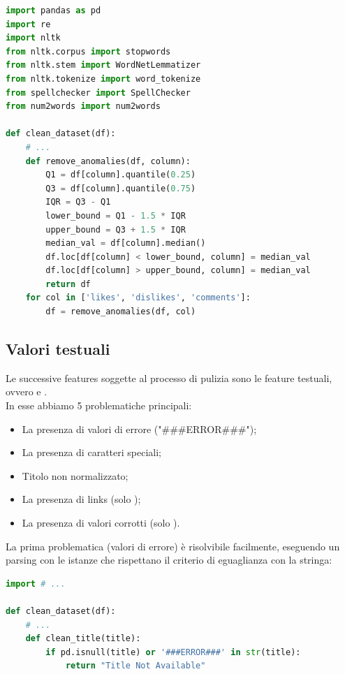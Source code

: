 \documentclass[a4paper,12pt]{report}
\begin{document}
\newpage
\begin{lstlisting}[language=Python]
import pandas as pd
import re
import nltk
from nltk.corpus import stopwords
from nltk.stem import WordNetLemmatizer
from nltk.tokenize import word_tokenize
from spellchecker import SpellChecker
from num2words import num2words

def clean_dataset(df):
    # ...
    def remove_anomalies(df, column):
        Q1 = df[column].quantile(0.25)
        Q3 = df[column].quantile(0.75)
        IQR = Q3 - Q1
        lower_bound = Q1 - 1.5 * IQR
        upper_bound = Q3 + 1.5 * IQR
        median_val = df[column].median()
        df.loc[df[column] < lower_bound, column] = median_val
        df.loc[df[column] > upper_bound, column] = median_val
        return df
    for col in ['likes', 'dislikes', 'comments']:
        df = remove_anomalies(df, col)
\end{lstlisting}
\subsection{Valori testuali}
Le successive features soggette al processo di pulizia sono le feature testuali, ovvero \texttt{\color{red}{title}} e \texttt{\color{red}{description}}.\\
In esse abbiamo 5 problematiche principali:
\begin{itemize}
        \item La presenza di valori di errore ("\#\#\#ERROR\#\#\#");
        \item La presenza di caratteri speciali;
        \item Titolo non normalizzato;
        \item La presenza di links (solo \texttt{\color{red}{description}});
        \item La presenza di valori corrotti (solo \texttt{\color{red}{title}}).
\end{itemize}
La prima problematica (valori di errore) è risolvibile facilmente, eseguendo un parsing con le istanze che rispettano il criterio di eguaglianza con la stringa:
\begin{lstlisting}[language=Python]
import # ...

def clean_dataset(df):
    # ...
    def clean_title(title):
        if pd.isnull(title) or '###ERROR###' in str(title):
            return "Title Not Available"
\end{lstlisting}
\end{document}
